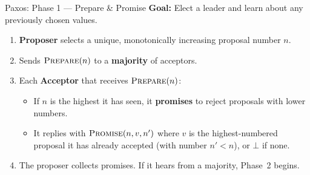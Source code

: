\begin{frame}{Paxos: Phase 1 --- Prepare \& Promise}
\textbf{Goal:} Elect a leader and learn about any previously chosen values.

\vspace{8pt}
\begin{enumerate}
  \item<2-> \textbf{Proposer} selects a unique, monotonically increasing proposal number $n$.
  \item<3-> Sends $\textsc{Prepare}(n)$ to a \textbf{majority} of acceptors.
  \item<4-> Each \textbf{Acceptor} that receives $\textsc{Prepare}(n)$:
    \begin{itemize}
      \item If $n$ is the highest it has seen, it \textbf{promises} to reject proposals with lower numbers.
      \item It replies with $\textsc{Promise}(n, v, n')$ where $v$ is the highest-numbered proposal it has already accepted (with number $n' < n$), or $\bot$ if none.
    \end{itemize}
  \item<5-> The proposer collects promises. If it hears from a majority, Phase~2 begins.
\end{enumerate}

\vspace{6pt}
\end{frame}

